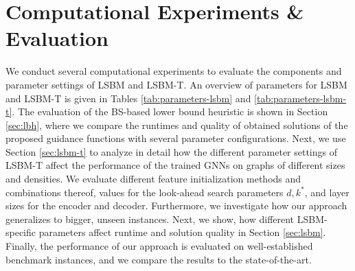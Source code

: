 \documentclass[draft,final]{vutinfth} %
\begin{document}



\chapter{Computational Experiments \& Evaluation}\label{chp:evaluation}

We conduct several computational experiments to evaluate the components and parameter settings of LSBM and LSBM-T. An overview of parameters for LSBM and LSBM-T is given in Tables \ref{tab:parameters-lsbm} and \ref{tab:parameters-lsbm-t}. 
The evaluation of the BS-based lower bound heuristic is shown in Section \ref{sec:lbh}, where we compare the runtimes and quality of obtained solutions of the proposed guidance functions with several parameter configurations. 
Next, we use Section \ref{sec:lsbm-t} to analyze in detail how the different parameter settings of LSBM-T affect the performance of the trained GNNs on graphs of different sizes and densities. We evaluate different feature initialization methods and combinations thereof, values for the look-ahead search parameters $d, k^*$, and layer sizes for the encoder and decoder. Furthermore, we investigate how our approach generalizes to bigger, unseen instances. 
Next, we show, how different LSBM-specific parameters affect runtime and solution quality in Section \ref{sec:lsbm}. 
Finally, the performance of our approach is evaluated on well-established benchmark instances, and we compare the results to the state-of-the-art. 
\end{document}

